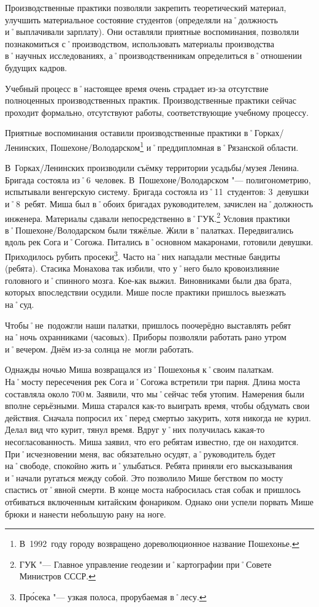 Производственные практики позволяли закрепить теоретический материал, улучшить материальное состояние студентов (определяли на˚должность и˚выплачивали зарплату). Они оставляли приятные воспоминания, позволяли познакомиться с˚производством, использовать материалы производства в˚научных исследованиях, а˚производственникам определиться в˚отношении будущих кадров.

Учебный процесс в˚настоящее время очень страдает из-за отсутствие полноценных производственных практик. Производственные практики сейчас проходит формально, отсутствуют работы, соответствующие учебному процессу. 

Приятные воспоминания оставили производственные практики в˚Горках\-/Ленинских, Пошехоне\-/Володарском\footnote{В~1992~году городу возвращено дореволюционное название Пошехонье.} и˚преддипломная в˚Рязанской области.

В~Горках\-/Ленинских производили съёмку территории усадьбы\-/музея Ленина. Бригада состояла из˚6~человек. В~Пошехоне\-/Володарском "--- полигонометрию, испытывали венгерскую систему. Бригада состояла из˚11~студентов: 3~девушки и˚8~ребят. Миша был в˚обоих бригадах руководителем, зачислен на˚должность инженера. Материалы сдавали непосредственно в˚ГУК.\footnote{ГУК "--- Главное управление геодезии и˚картографии при˚Совете Министров СССР.} Условия практики в˚Пошехоне\-/Володарском были тяжёлые. Жили в˚палатках. Передвигались вдоль рек Сога и˚Согожа. Питались в˚основном макаронами, готовили девушки. Приходилось рубить просеки\footnote{Пр\'{о}сека "--- узкая полоса, прорубаемая в˚лесу.}. Часто на˚них нападали местные бандиты (ребята). Стасика Монахова так избили, что у˚него было кровоизлияние головного и˚спинного мозга. Кое-как выжил. Виновниками были два брата, которых впоследствии осудили. Мише после практики пришлось выезжать на˚суд. 

Чтобы˚не~подожгли наши палатки, пришлось поочерёдно выставлять ребят на˚ночь охранниками (часовых). Приборы позволяли работать рано утром и˚вечером. Днём из-за солнца не~могли работать. 

Однажды ночью Миша возвращался из˚Пошехонья к˚своим палаткам. На˚мосту пересечения рек Сога и˚Согожа встретили три парня. Длина моста составляла около 700\,м. Заявили, что мы˚сейчас тебя утопим. Намерения были вполне серьёзными. Миша старался как-то выиграть время, чтобы обдумать свои действия. Сначала попросил их˚перед смертью закурить, хотя никогда не~курил. Делал вид что курит, тянул время. Вдруг у˚них получилась какая-то несогласованность. Миша заявил, что его ребятам известно, где он находится. При˚исчезновении меня, вас обязательно осудят, а˚руководитель будет на˚свободе, спокойно жить и˚улыбаться. Ребята приняли его высказывания и˚начали ругаться между собой. Это позволило Мише бегством по мосту спастись от˚явной смерти. В конце моста набросилась стая собак и пришлось отбиваться включенным китайским фонариком. Однако они успели порвать Мише брюки и нанести небольшую рану на ноге.

